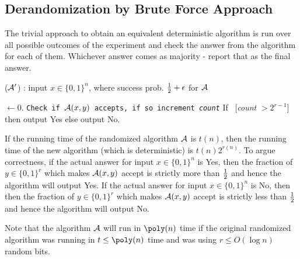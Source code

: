 \subsection{Derandomization by Brute Force Approach}

\noindent The trivial approach to obtain an equivalent deterministic algorithm is run over all possible outcomes of the experiment and check the answer from the algorithm for each of them. Whichever answer comes as majority - report that as the final answer.

\begin{algorithm}
\label{alg:trivial-derand}
\caption{(${\cal{A}'}$) : input $x \in \{0,1\}^n$, where success prob. $\frac{1}{2}+\epsilon$ for ${\cal{A}}$} 
\begin{algorithmic}[1]
 $\gets 0$. 
	\State \texttt{Check if ${\cal{A}}(x,y)$ accepts, if so increment {\em count}}
\EndFor
\State If ~[{\em count} $> 2^{r-1}$]~ then output {\sc Yes} else output {\sc No}.
\end{algorithmic}
\end{algorithm}

If the running time of the randomized algorithm ${\cal{A}}$ is $t(n)$, then the running time of the new algorithm (which is deterministic) is $t(n)2^{r(n)}$. To argue correctness, if the actual answer for input $x \in \{0,1\}^n$ is {\sc Yes}, then the fraction of $y \in \{0,1\}^r$ which makes ${\cal{A}}(x,y)$ accept is strictly more than $\frac{1}{2}$ and hence the algorithm will output {\sc Yes}. If the actual answer for input $x \in \{0,1\}^n$ is {\sc No}, then then the fraction of $y \in \{0,1\}^r$ which makes ${\cal{A}}(x,y)$ accept is strictly less than $\frac{1}{2}$ and hence the algorithm will output {\sc No}.

\begin{remark}
Note that the algorithm ${\cal{A}}$ will run in $\poly(n)$ time if the original randomized algorithm was running in $t \le \poly(n)$ time and was using $r \le O(\log n)$ random bits.
\end{remark}

%
%

